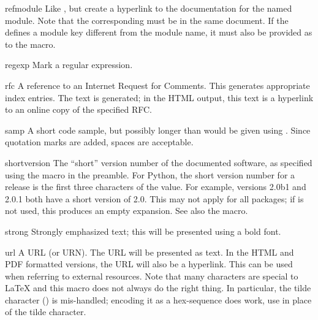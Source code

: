 \documentclass{howto}
\begin{document}
    \begin{macrodesc}{refmodule}{}
      Like , but create a hyperlink to the documentation 
      for the named module.  Note that the corresponding
       must be in the same document.  If the
       defines a module key different from the
      module name, it must also be provided as  to the
       macro.
    \end{macrodesc}

    \begin{macrodesc}{regexp}{}
      Mark a regular expression.
    \end{macrodesc}

    \begin{macrodesc}{rfc}{}
      A reference to an Internet Request for Comments.  This generates 
      appropriate index entries.  The text  is
      generated; in the HTML output, this text is a hyperlink to an
      online copy of the specified RFC.
    \end{macrodesc}

    \begin{macrodesc}{samp}{}
      A short code sample, but possibly longer than would be given
      using .  Since quotation marks are added, spaces are 
      acceptable.
    \end{macrodesc}

    \begin{macrodesc}{shortversion}{}
      The ``short'' version number of the documented software, as
      specified using the  macro in the
      preamble.  For Python, the short version number for a release is
      the first three characters of the  value.  For
      example, versions 2.0b1 and 2.0.1 both have a short version of
      2.0.  This may not apply for all packages; if
       is not used, this produces an empty
      expansion.  See also the  macro.
    \end{macrodesc}

    \begin{macrodesc}{strong}{}
      Strongly emphasized text; this will be presented using a bold
      font.
    \end{macrodesc}

    \begin{macrodesc}{url}{}
      A URL (or URN).  The URL will be presented as text.  In the HTML 
      and PDF formatted versions, the URL will also be a hyperlink.
      This can be used when referring to external resources.  Note
      that many characters are special to \LaTeX{} and this macro
      does not always do the right thing.  In particular, the tilde
      character (\character{\~}) is mis-handled; encoding it as a
      hex-sequence does work, use  in place of the tilde
      character.
    \end{macrodesc}
\end{document}
